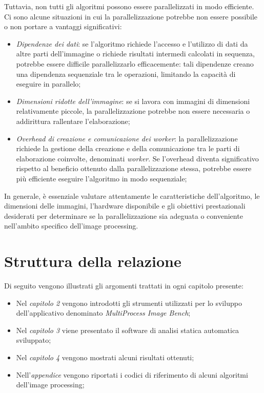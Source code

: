 Tuttavia, non tutti gli algoritmi possono essere parallelizzati in modo efficiente. Ci sono alcune situazioni in cui la parallelizzazione potrebbe non essere possibile o non portare a vantaggi significativi:
\begin{itemize}
	\item \textit{Dipendenze dei dati}: se l'algoritmo richiede l'accesso e l'utilizzo di dati da altre parti dell'immagine o richiede risultati intermedi calcolati in sequenza, potrebbe essere difficile parallelizzarlo efficacemente: tali dipendenze creano una dipendenza sequenziale tra le operazioni, limitando la capacità di eseguire in parallelo;
	\item \textit{Dimensioni ridotte dell'immagine}: se si lavora con immagini di dimensioni relativamente piccole, la parallelizzazione potrebbe non essere necessaria o addirittura rallentare l'elaborazione;
	\item \textit{Overhead di creazione e comunicazione dei worker}: la parallelizzazione richiede la gestione della creazione e della comunicazione tra le parti di elaborazione coinvolte, denominati \textit{worker}. Se l'overhead diventa significativo rispetto al beneficio ottenuto dalla parallelizzazione stessa, potrebbe essere più efficiente eseguire l'algoritmo in modo sequenziale;
\end{itemize}

In generale, è essenziale valutare attentamente le caratteristiche dell'algoritmo, le dimensioni delle immagini, l'hardware disponibile e gli obiettivi prestazionali desiderati per determinare se la parallelizzazione sia adeguata o conveniente nell'ambito specifico dell'image processing.

\section{Struttura della relazione}
Di seguito vengono illustrati gli argomenti trattati in ogni capitolo presente:
\begin{itemize}
	\item Nel \textit{capitolo 2} vengono introdotti gli strumenti utilizzati per lo sviluppo dell'applicativo denominato\textit{ MultiProcess Image Bench};
	\item Nel \textit{capitolo 3} viene presentato il software di analisi statica automatica sviluppato;
	\item Nel \textit{capitolo 4} vengono mostrati alcuni risultati ottenuti;
	\item Nell'\textit{appendice} vengono riportati i codici di riferimento di alcuni algoritmi dell'image processing;
\end{itemize}